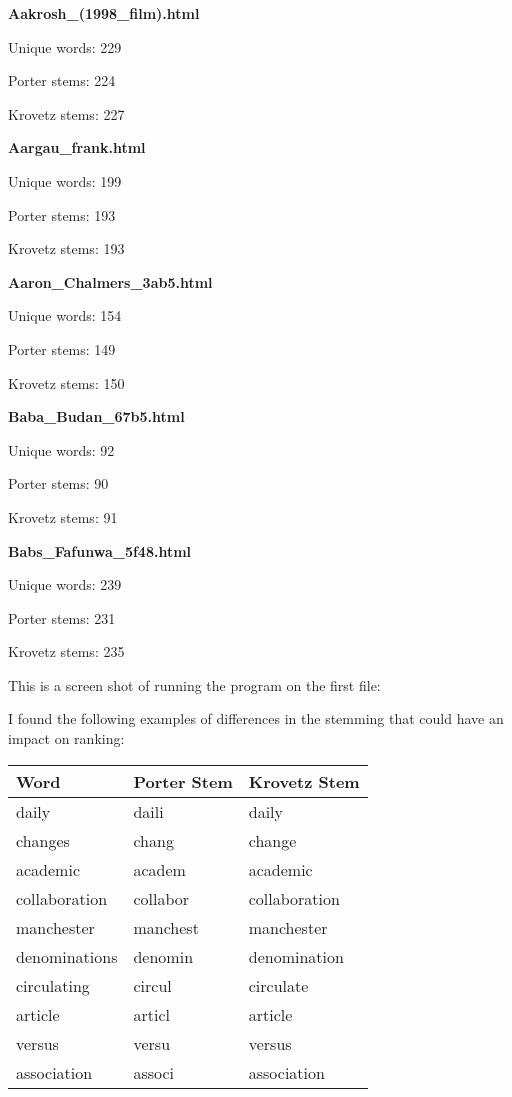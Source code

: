 \documentclass[a4paper, 11pt]{article}
\begin{document}
\textbf{Aakrosh\_(1998\_film).html}

Unique words: 229

Porter stems: 224

Krovetz stems: 227
 
\textbf{Aargau\_frank.html}

Unique words: 199

Porter stems: 193

Krovetz stems: 193

\textbf{Aaron\_Chalmers\_3ab5.html}

Unique words: 154

Porter stems: 149

Krovetz stems: 150

\textbf{Baba\_Budan\_67b5.html}

Unique words: 92

Porter stems: 90

Krovetz stems: 91

\textbf{Babs\_Fafunwa\_5f48.html}

Unique words: 239

Porter stems: 231

Krovetz stems: 235

This is a screen shot of running the program on the first file:




I found the following examples of differences in the stemming that could have an impact on ranking:

\begin{longtable}{ |p{3cm}|p{3cm}|p{3cm}| } 
\hline
Word & Porter Stem & Krovetz Stem \\
 \hline 
 daily & daili & daily \\
 \hline
  changes & chang & change \\
 \hline
  academic & academ & academic \\
 \hline
  collaboration & collabor & collaboration \\
 \hline
  manchester & manchest & manchester \\
 \hline
  denominations & denomin & denomination \\
 \hline
  circulating & circul & circulate \\
 \hline
  article & articl & article \\
 \hline
  versus & versu & versus \\
 \hline
  association & associ & association \\
 \hline
\end{longtable}
\end{document}
